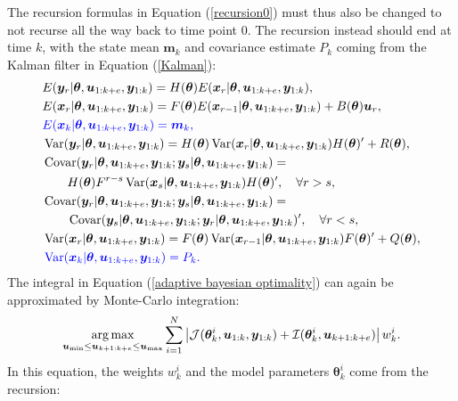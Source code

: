 The recursion formulas in Equation (\ref{recursion0}) must thus also be changed to not recurse all the way back to time point $0$. The recursion instead should end at time $k$, with the state mean $\bm m_k$ and covariance estimate $P_k$ coming from the Kalman filter in Equation (\ref{Kalman}):
\begin{equation}
\begin{aligned}
&E(\bm y_r |\bm \theta, \bm u_{1:k+e}, \bm y_{1:k})
= H(\bm \theta)E(\bm x_r |\bm \theta, \bm u_{1:k+e}, \bm y_{1:k}),\\
&E(\bm x_r |\bm \theta, \bm u_{1:k+e}, \bm y_{1:k})
= F(\bm \theta)E(\bm x_{r-1} |\bm \theta, \bm u_{1:k+e}, \bm y_{1:k})
+ B(\bm \theta)\bm u_r,\\
&\color{blue}E(\bm x_k|\bm \theta, \bm u_{1:k+e}, \bm y_{1:k})
= \color{blue} \bm m_k,\\
&\operatorname{\mathrm{Var}} (\bm y_r |\bm \theta, \bm u_{1:k+e}, \bm y_{1:k})
= H(\bm \theta)\operatorname{\mathrm{Var}} (\bm x_r |\bm \theta, \bm u_{1:k+e}, \bm y_{1:k})H(\bm \theta)'
+R(\bm \theta),\\
&\operatorname{\mathrm{Covar}} (\bm y_r |\bm \theta, \bm u_{1:k+e}, \bm y_{1:k};\bm y_s |\bm \theta, \bm u_{1:k+e}, \bm y_{1:k}) =\\
& \qquad  H(\bm \theta)F^{r-s}\operatorname{\mathrm{Var}} (\bm x_s |\bm \theta, \bm u_{1:k+e}, \bm y_{1:k})H(\bm \theta)',
\quad \forall r>s,\\
&\operatorname{\mathrm{Covar}} (\bm y_r |\bm \theta, \bm u_{1:k+e}, \bm y_{1:k};\bm y_s |\bm \theta, \bm u_{1:k+e}, \bm y_{1:k})=\\
&\qquad \operatorname{\mathrm{Covar}} (\bm y_s |\bm \theta, \bm u_{1:k+e}, \bm y_{1:k};\bm y_r |\bm \theta, \bm u_{1:k+e}, \bm y_{1:k})' ,
\quad \forall r<s, \\
&\operatorname{\mathrm{Var}} (\bm x_r |\bm \theta, \bm u_{1:k+e}, \bm y_{1:k})
= F(\bm \theta)\operatorname{\mathrm{Var}} (\bm x_{r-1} |\bm \theta, \bm u_{1:k+e}, \bm y_{1:k})F(\bm \theta)'
+ Q(\bm \theta),\\
&\color{blue} \operatorname{\mathrm{Var}} (\bm x_k |\bm \theta, \bm u_{1:k+e}, \bm y_{1:k})
= \color{blue} P_k.
\end{aligned}
\label{recursioni}
\end{equation}
The integral in Equation (\ref{adaptive bayesian optimality}) can again be approximated by Monte-Carlo integration:
\begin{equation}
\operatorname*{arg\,max}_{\bm u_\text{min} \leq \bm u_{k+1:k+e} \leq \bm u_\text{max}}
\sum_{i=1}^N
\left |\mathcal{J}(\bm \theta^i_k,\bm u_{1:k}, \bm y_{1:k}) + \mathcal{I}(\bm \theta^i_k,\bm u_{k+1:k+e}) \right |w_k^i.
\label{final criterion}
\end{equation}
In this equation, the weights $w_k^i$ and the model parameters $\bm \theta_k^i$ come from the recursion:
